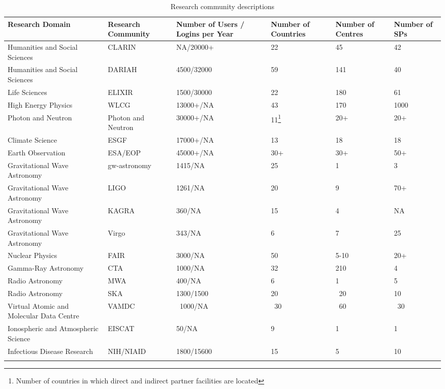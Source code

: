 \documentclass[fleqn,11pt]{wlscirep}
\begin{document}
{\begin{center}
\begin{longtable}{|p{5cm}|*{5}{p{}|}} 
\hline
Research Domain & Research Community & Number of Users / Logins per Year & Number of Countries & Number of Centres & Number of SPs \\
\hline \hline
\endhead
\hline
Humanities and Social Sciences & CLARIN & NA/20000+ & 22 & 45 & 42 \\
\hline
Humanities and Social Sciences & DARIAH & 4500/32000 & 59 & 141 & 40\\
\hline
Life Sciences& ELIXIR&1500/30000&22&180&61\\
\hline
High Energy Physics&WLCG&13000+/NA&43&170&1000\\
\hline
Photon and Neutron&Photon and Neutron&30000+/NA&11\footnote{Number of countries in which direct and indirect partner facilities are located}&20+&20+\\
\hline
Climate Science&ESGF& 17000+/NA&13&18&18\\
\hline
Earth Observation&ESA/EOP&45000+/NA&30+&30+&50+\\
\hline
Gravitational Wave Astronomy&gw-astronomy&1415/NA&25&1&3\\
\hline
Gravitational Wave Astronomy&LIGO&1261/NA&20&9&70+\\
\hline
Gravitational Wave Astronomy&KAGRA&360/NA&15&4&NA\\
\hline
Gravitational Wave Astronomy&Virgo&343/NA&6&7&25\\
\hline
Nuclear Physics&FAIR&3000/NA&50&5-10&20+\\
\hline
Gamma-Ray Astronomy&CTA& 1000/NA&32&210&4\\
\hline
Radio Astronomy&MWA&400/NA&6&1&5\\
\hline
Radio Astronomy&SKA&1300/1500&20&~20&10\\
\hline
Virtual Atomic and Molecular Data Centre&VAMDC&~1000/NA&~30&~60&~30\\
\hline
Ionospheric and Atmospheric Science&EISCAT&50/NA&9&1&1\\
\hline
Infectious Disease Research&NIH/NIAID&1800/15600&15&5&10\\
\hline
\caption{Research community descriptions}
\label{tab:table1}
\end{longtable}
\end{center}

}
\end{document}
